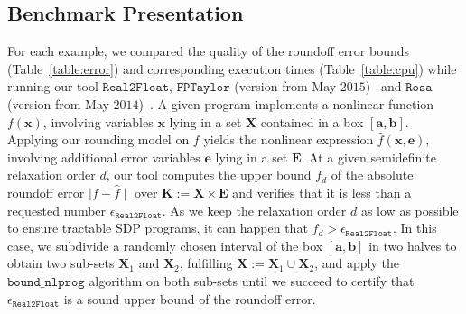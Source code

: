 \documentclass[preprint,fleqn,nocopyrightspace]{sigplanconf}
\newcommand{\x}{\mathbf{x}}
\newcommand{\e}{\mathbf{e}}
\renewcommand{\b}{\mathbf{b}}
\def\a{\mathbf{a}}
\def\E{\mathbf{E}}
\def\K{\mathbf{K}}
\def\X{\mathbf{X}}
\newcommand{\boundnlprog}{\mathtt{bound\_nlprog}}
\newcommand{\realtofloat}{\mathtt{Real2Float}}
\newcommand{\rosa}{\mathtt{Rosa}}
\newcommand{\fptaylor}{\mathtt{FPTaylor}}
\theoremstyle{plain}
\begin{document}
\subsection{Benchmark Presentation}
For each example, we compared the quality of the roundoff error bounds (Table~\ref{table:error}) and corresponding execution times (Table~\ref{table:cpu}) while running our tool $\realtofloat$, $\fptaylor$ (version from May $2015$)~\cite{fptaylor15} and $\rosa$ (version from  May $2014$)~\cite{Darulova14Popl}.
A given program implements a nonlinear function $f(\x)$, involving variables $\x$ lying in a set $\X$ contained in a box $[\a, \b]$.
Applying our rounding model on $f$ yields the nonlinear expression $\hat{f}(\x,\e)$, involving additional error variables $\e$ lying in a set $\E$. 
At a given semidefinite relaxation order $d$, our tool computes the upper bound $f_d$ of the absolute roundoff error $\mid f - \hat{f} \mid $ over $\K := \X \times \E$ and verifies that it is less than a requested number $\epsilon_{\realtofloat}$. As we keep the relaxation order $d$ as low as possible to ensure tractable SDP programs, it can happen that $f_d > \epsilon_{\realtofloat}$. 
 In this case, we subdivide a randomly chosen interval of the box  $[\a, \b]$ in two halves to obtain two sub-sets $\X_1$ and $\X_2$, fulfilling $\X := \X_1 \cup \X_2$, and apply the $\boundnlprog$ algorithm on both sub-sets until we succeed to certify that $\epsilon_{\realtofloat}$ is a sound upper bound of the roundoff error.
\end{document}
